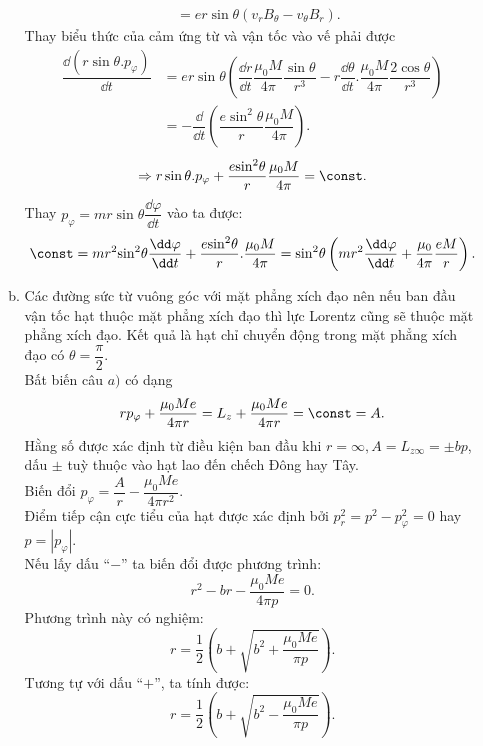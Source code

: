\begin{loigiai}
\begin{enumerate}[1)]
\begin{enumerate}[a)]
\[\begin{aligned}
                &=er\sin \theta \left( {{v}_{r}}{{B}_{\theta }}-{{v}_{\theta }}{{B}_{r}} \right).
            \end{aligned}\]
            Thay biểu thức của cảm ứng từ và vận tốc vào vế phải được
            \[\begin{aligned}
                \dfrac{\dd\left( r\sin \theta .{{p}_{\varphi }} \right)}{\dd t}&=er\sin \theta \left( \dfrac{\dd r}{\dd t}\dfrac{{{\mu }_{0}}M}{4\pi }\dfrac{\sin \theta}{{{r}^{3}}}-r\dfrac{\dd\theta }{\dd t}.\dfrac{{{\mu }_{0}}M}{4\pi }\dfrac{2\cos \theta }{{{r}^{3}}} \right)\\
                &=-\dfrac{\dd}{\dd t}\left( \dfrac{e{{\sin }^{2}}\theta }{r}\dfrac{{{\mu }_{0}}M}{4\pi } \right).
            \end{aligned}\]
            \[\Rightarrow r\sin \theta .{{p}_{\varphi }}+\dfrac{e{{\sin }^{2}}\theta }{r}\dfrac{{{\mu }_{0}}M}{4\pi } = \const.\]
            Thay ${{p}_{\varphi}}=mr\sin \theta \dfrac{\dd\varphi}{\dd t}$ vào ta được: 
            \[\const = m {{r}^{2}}{{\sin }^{2}}\theta \dfrac{\dd\varphi }{\dd t}+\dfrac{e{{\sin }^{2}}\theta }{r}.\dfrac{{{\mu }_{0}}M}{4\pi }={{\sin }^{2}}\theta \left( m{{r}^{2}}\dfrac{\dd\varphi }{\dd t}+\dfrac{{{\mu }_{0}}}{4\pi }\dfrac{eM}{r} \right).\]
            \item Các đường sức từ vuông góc với mặt phẳng xích đạo nên nếu ban đầu vận tốc hạt thuộc mặt phẳng xích đạo thì lực Lorentz cũng sẽ thuộc mặt phẳng xích đạo. Kết quả là hạt chỉ chuyển động trong mặt phẳng xích đạo có $\theta =\dfrac{\pi }{2}$.
            \\Bất biến câu $a)$ có dạng \[r{{p}_{\varphi }}+\dfrac{{{\mu }_{0}}Me}{4\pi r}={{L}_{z}}+\dfrac{{{\mu }_{0}}Me}{4\pi r}=\const=A.\]
            Hằng số được xác định từ điều kiện ban đầu khi $r=\infty ,A={{L}_{z\infty }}=\pm bp$, dấu $\pm $ tuỳ thuộc vào hạt lao đến chếch Đông hay Tây.
            \\Biến đổi ${{p}_{\varphi }}=\dfrac{A}{r}-\dfrac{{{\mu }_{0}}Me}{4\pi {{r}^{2}}}$.
            \\Điểm tiếp cận cực tiểu của hạt được xác định bởi $p_{r}^{2}={{p}^{2}}-p_{\varphi }^{2}=0$ hay $p=\left| {{p}_{\varphi }} \right|$.
            \\Nếu lấy dấu ``$-$'' ta biến đổi được phương trình: \[{{r}^{2}}-br-\dfrac{{{\mu }_{0}}Me}{4\pi p}=0.\]
            Phương trình này có nghiệm:
            \[r=\dfrac{1}{2}\left( b+\sqrt{{{b}^{2}}+\dfrac{{{\mu }_{0}}Me}{\pi p}} \right).\]
            Tương tự với dấu ``$+$'', ta tính được: \[r=\dfrac{1}{2}\left( b+\sqrt{{{b}^{2}}-\dfrac{{{\mu }_{0}}Me}{\pi p}} \right).\]

\end{enumerate}
\end{enumerate}
\end{loigiai}
